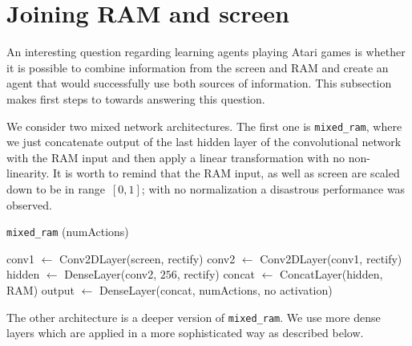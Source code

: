 \section{Joining RAM and screen}\label{screen-ram-networks}

An interesting question regarding learning agents playing Atari games is whether it is possible to combine information from the screen and RAM and create an agent that would successfully use both sources of information. This subsection makes first steps to towards answering this question.

We consider two mixed network architectures. The first one is \texttt{mixed\_ram}, where we just concatenate output of the last hidden layer of the convolutional network with the RAM input and then apply a linear transformation with no non-linearity. It is worth to remind that the RAM input, as well as screen are scaled down to be in range~$[0, 1]$; with no normalization a disastrous performance was observed.

\begin{algorithm}[H]
\caption{\texttt{mixed\_ram} (numActions)}

\SetAlgoVlined
\DontPrintSemicolon

\vspace{0.05cm}

conv1 $\leftarrow$ Conv2DLayer(screen, rectify)\;
conv2 $\leftarrow$ Conv2DLayer(conv1, rectify)\;
hidden $\leftarrow$ DenseLayer(conv2, $256$, rectify)\;
concat $\leftarrow$ ConcatLayer(hidden, RAM)\;
output $\leftarrow$ DenseLayer(concat, numActions, no activation)\;

\end{algorithm}

The other architecture is a deeper version of \texttt{mixed\_ram}. We use more dense layers which are applied in a more sophisticated way as described below.

